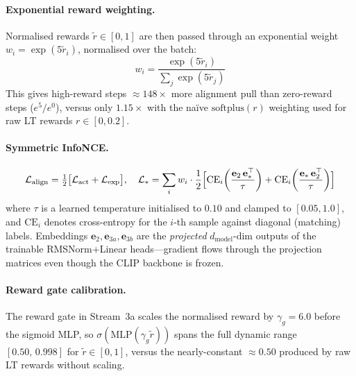 \documentclass{article}
\begin{document}
\paragraph{Exponential reward weighting.}
Normalised rewards $\tilde{r}\in[0,1]$ are then passed through an
exponential weight $w_i = \exp(5\tilde{r}_i)$, normalised over the batch:
\begin{equation}
  w_i = \frac{\exp(5\tilde{r}_i)}{\sum_j \exp(5\tilde{r}_j)}
  \label{eq:exp_weight}
\end{equation}
This gives high-reward steps $\approx\!148{\times}$ more alignment pull
than zero-reward steps ($e^5/e^0$), versus only $1.15{\times}$ with the
na\"ive $\mathrm{softplus}(r)$ weighting used for raw LT rewards
$r\!\in\![0,0.2]$.

\paragraph{Symmetric InfoNCE.}
\begin{equation}
  \mathcal{L}_{\mathrm{align}}
  = \tfrac{1}{2}\bigl[
    \mathcal{L}_{\mathrm{act}}
    + \mathcal{L}_{\mathrm{exp}}
  \bigr],
  \quad
  \mathcal{L}_{*}
  = \sum_{i} w_i \cdot
    \frac{1}{2}\Bigl[
      \mathrm{CE}_i\!\left(\frac{\mathbf{e}_2\,\mathbf{e}_{*}^{\top}}{\tau}\right)
    + \mathrm{CE}_i\!\left(\frac{\mathbf{e}_{*}\,\mathbf{e}_2^{\top}}{\tau}\right)
    \Bigr]
  \label{eq:infonce}
\end{equation}
where $\tau$ is a learned temperature initialised to $0.10$ and clamped to
$[0.05, 1.0]$, and $\mathrm{CE}_i$ denotes cross-entropy for the $i$-th
sample against diagonal (matching) labels.
Embeddings $\mathbf{e}_2,\mathbf{e}_{3a},\mathbf{e}_{3b}$ are the
\emph{projected} $d_{\mathrm{model}}$-dim outputs of the trainable
RMSNorm+Linear heads---gradient flows through the projection matrices
even though the CLIP backbone is frozen.

\paragraph{Reward gate calibration.}
The reward gate in Stream~3a scales the normalised reward by $\gamma_g{=}6.0$
before the sigmoid MLP, so $\sigma(\mathrm{MLP}(\gamma_g \tilde{r}))$ spans
the full dynamic range $[0.50,\,0.998]$ for $\tilde{r}\!\in\![0,1]$,
versus the nearly-constant $\approx 0.50$ produced by raw LT rewards without
scaling.
\end{document}
